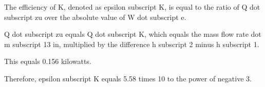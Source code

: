 The efficiency of K, denoted as epsilon subscript K, is equal to the ratio of Q dot subscript zu over the absolute value of W dot subscript e.

Q dot subscript zu equals Q dot subscript K, which equals the mass flow rate dot m subscript 13 in, multiplied by the difference h subscript 2 minus h subscript 1.

This equals 0.156 kilowatts.

Therefore, epsilon subscript K equals 5.58 times 10 to the power of negative 3.